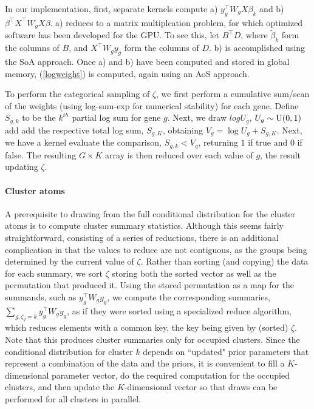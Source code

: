 {In our implementation, first, separate kernels compute a) $y_g^\top W_g X \beta_k$ and b) $\beta^\top X^\top W_g X \beta$. a) reduces to a matrix multiplcation problem, for which optimized software has been developed for the GPU. To see this, let $B^\top D$, where $\tilde{\beta}_k$ form the columns of $B$, and $X^\top W_g y_g$ form the columns of $D$. b) is accomplished using the SoA approach. Once a) and b) have been computed and stored in global memory, (\ref{logweight}) is computed, again using an AoS approach.

To perform the categorical sampling of $\zeta$, we first perform a cumulative sum/scan of the weights (using log-sum-exp for numerical stability) for each gene. Define $S_{g,k}$ to be the $k^{th}$ partial log sum for gene $g$. Next, we draw $log U_g$, $U_g \sim \operatorname{U}(0,1)$ add add the respective total log sum, $S_{g,K}$, obtaining $V_g = \log U_g + S_{g,K}$. Next, we have a kernel evaluate the comparison, $S_{g,k}<V_g$, returning $1$ if true and $0$ if false. The resulting $G\times K$ array is then reduced over each value of $g$, the result updating $\zeta$.

\paragraph{Cluster atoms}
A prerequisite to drawing from the full conditional distribution for the cluster atoms is to compute cluster summary statistics. Although this seems fairly straightforward, consisting of a series of reductions, there is an additional complication in that the values to reduce are not contiguous, as the groups being determined by the current value of $\zeta$. Rather than sorting (and copying) the data for each summary, we sort $\zeta$ storing both the sorted vector as well as the permutation that produced it. Using the stored permutation as a map for the summands, such as $y_g^\top W_g y_g$, we compute the corresponding summaries, $\sum_{g:\zeta_g=k}y_g^\top W_g y_g$, as if they were sorted using a specialized reduce algorithm, which reduces elements with a common key, the key being given by (sorted) $\zeta$. Note that this produces cluster summaries only for occupied clusters. Since the conditional distribution for cluster $k$ depends on ``updated" prior parameters that represent a combination of the data and the priors, it is convenient to fill a $K$-dimensional parameter vector, do the required computation for the occupied clusters, and then update the $K$-dimensional vector so that draws can be performed for all clusters in parallel.

}
